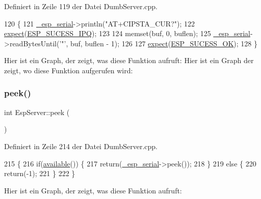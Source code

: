 Definiert in Zeile 119 der Datei Dumb\+Server.\+cpp.


\begin{DoxyCode}
120 \{
121   \hyperlink{class_esp_server_a33166aa92db341d47cdf1776492cca62}{\_esp\_serial}->println(\textcolor{stringliteral}{"AT+CIPSTA\_CUR?"});
122   \hyperlink{class_esp_server_a2008f0d315cff00a4bcc1120eeb2dc95}{expect}(\hyperlink{_dumb_server_8cpp_a4a3c8fcc7b628944ea321ad928a00bd9}{ESP\_SUCESS\_IPQ});
123 
124   memset(buf, 0, buflen);
125   \hyperlink{class_esp_server_a33166aa92db341d47cdf1776492cca62}{\_esp\_serial}->readBytesUntil(\textcolor{charliteral}{'"'}, buf, buflen - 1);
126 
127   \hyperlink{class_esp_server_a2008f0d315cff00a4bcc1120eeb2dc95}{expect}(\hyperlink{_dumb_server_8cpp_a62497fcb12b1cedd5fdfbc0755508d87}{ESP\_SUCESS\_OK});
128 \}
\end{DoxyCode}
Hier ist ein Graph, der zeigt, was diese Funktion aufruft\+:
Hier ist ein Graph der zeigt, wo diese Funktion aufgerufen wird\+:
\mbox{\label{class_esp_server_a005a9cd487f4ccb4ccef72197bf263b7}} 
\subsubsection{\texorpdfstring{peek()}{peek()}}
{\footnotesize\ttfamily int Esp\+Server\+::peek (\begin{DoxyParamCaption}{ }\end{DoxyParamCaption})\hspace{0.3cm}{\ttfamily [virtual]}}



Definiert in Zeile 214 der Datei Dumb\+Server.\+cpp.


\begin{DoxyCode}
215 \{
216   \textcolor{keywordflow}{if}(\hyperlink{class_esp_server_aad68b4972f6b8426004feeef6e98d02d}{available}()) \{
217     \textcolor{keywordflow}{return}(\hyperlink{class_esp_server_a33166aa92db341d47cdf1776492cca62}{\_esp\_serial}->peek());
218   \}
219   \textcolor{keywordflow}{else} \{
220     \textcolor{keywordflow}{return}(-1);
221   \}
222 \}
\end{DoxyCode}
Hier ist ein Graph, der zeigt, was diese Funktion aufruft\+:
\mbox{\label{class_esp_server_ae47512714818b3b9a1d29d2bf1f70fdf}} 
